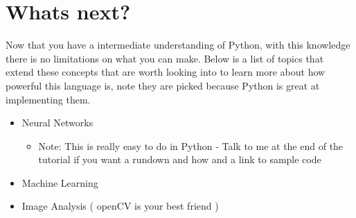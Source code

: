 \documentclass{article}
\begin{document}
\section{Whats next?}
Now that you have a intermediate understanding of Python, with this knowledge there is no limitations on what you can make. Below is a list of topics that extend these concepts that are worth looking into to learn more about how powerful this language is, note they are picked because Python is great at implementing them.
\begin{itemize}
    \item Neural Networks 
    \begin{itemize}
        \item Note: This is really easy to do in Python - Talk to me at the end of the tutorial if you want a rundown and how and a link to sample code 
    \end{itemize}
    \item Machine Learning
    \item Image Analysis ( openCV is your best friend )  
\end{itemize}
\end{document}
